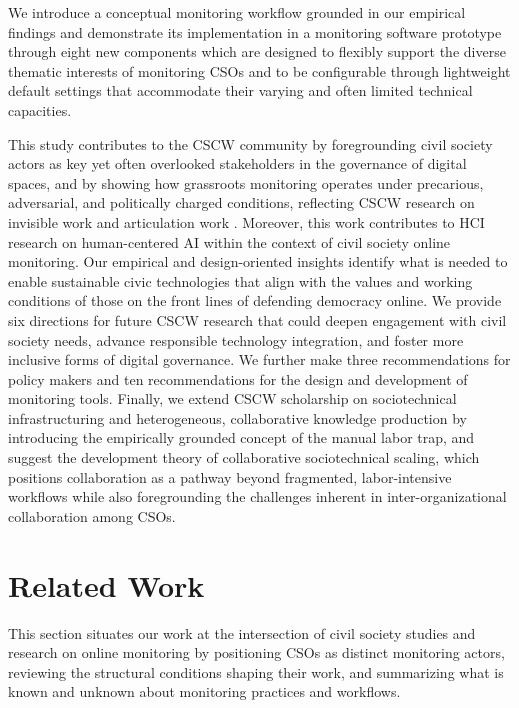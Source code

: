 \documentclass[acmsmall]{acmart}
\begin{document}
We introduce a conceptual monitoring workflow grounded in our empirical findings and demonstrate its implementation in a monitoring software prototype through eight new components which are designed to flexibly support the diverse thematic interests of monitoring CSOs and to be configurable through lightweight default settings that accommodate their varying and often limited technical capacities.

This study contributes to the CSCW community by foregrounding civil society actors as key yet often overlooked stakeholders in the governance of digital spaces, and by showing how grassroots monitoring operates under precarious, adversarial, and politically charged conditions, reflecting CSCW research on invisible work and articulation work \cite{star_layers_1999,schmidt_taking_2011}. Moreover, this work contributes to HCI research on human-centered AI \cite{auernhammer_human-centered_2020,bingley_where_2023} within the context of civil society online monitoring. 
Our empirical and design-oriented insights identify what is needed to enable sustainable civic technologies that align with the values and working conditions of those on the front lines of defending democracy online. 
We provide six directions for future CSCW research that could deepen engagement with civil society needs, advance responsible technology integration, and foster more inclusive forms of digital governance. We further make three recommendations for policy makers and ten recommendations for the design and development of monitoring tools. 
Finally, we extend CSCW scholarship on sociotechnical infrastructuring \cite{star_steps_1994,neumann_making_1996,karasti_infrastructuring_2014} and heterogeneous, collaborative knowledge production \cite{ackerman_sharing_2013,star_institutional_1989} by introducing the empirically grounded concept of the manual labor trap, and suggest the development theory of collaborative sociotechnical scaling, which positions collaboration as a pathway beyond fragmented, labor-intensive workflows while also foregrounding the challenges inherent in inter-organizational collaboration among CSOs.

\section{Related Work}
This section situates our work at the intersection of civil society studies and research on online monitoring by positioning CSOs as distinct monitoring actors, reviewing the structural conditions shaping their work, and summarizing what is known and unknown about monitoring practices and workflows.
\end{document}
